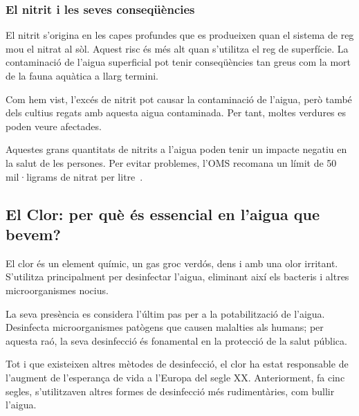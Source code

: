 \subsubsection{El nitrit i les seves conseqüències}
El nitrit s'origina en les capes profundes que es produeixen quan el sistema de reg mou el nitrat al sòl. Aquest risc és més alt quan s'utilitza el reg de superfície. La contaminació de l'aigua superficial pot tenir conseqüències tan greus com la mort de la fauna aquàtica a llarg termini.

Com hem vist, l'excés de nitrit pot causar la contaminació de l'aigua, però també dels cultius regats amb aquesta aigua contaminada. Per tant, moltes verdures es poden veure afectades.

Aquestes grans quantitats de nitrits a l'aigua poden tenir un impacte negatiu en la salut de les persones. Per evitar problemes, l'OMS recomana un límit de 50 mil·ligrams de nitrat per litre~\cite{Scielo}.


\subsection{El Clor: per què és essencial en l’aigua que bevem?} \label{subsec:clor}
El clor és un element químic, un gas groc verdós, dens i amb una olor irritant. S'utilitza principalment per desinfectar l'aigua, eliminant així els bacteris i altres microorganismes nocius.

La seva presència es considera l'últim pas per a la potabilització de l'aigua. Desinfecta microorganismes patògens que causen malalties als humans; per aquesta raó, la seva desinfecció és fonamental en la protecció de la salut pública.

Tot i que existeixen altres mètodes de desinfecció, el clor ha estat responsable de l'augment de l'esperança de vida a l'Europa del segle XX. Anteriorment, fa cinc segles, s'utilitzaven altres formes de desinfecció més rudimentàries, com bullir l'aigua.

